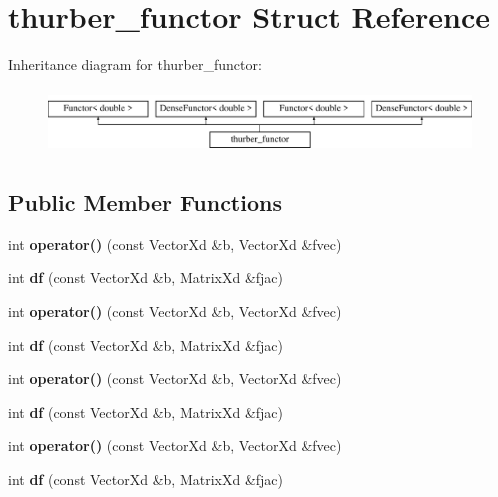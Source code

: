\hypertarget{structthurber__functor}{}\section{thurber\+\_\+functor Struct Reference}
\label{structthurber__functor}
Inheritance diagram for thurber\+\_\+functor\+:\begin{figure}[H]
\begin{center}
\leavevmode
\includegraphics[height=1.728395cm]{structthurber__functor}
\end{center}
\end{figure}
\subsection*{Public Member Functions}
\begin{DoxyCompactItemize}
\item 
\mbox{\label{structthurber__functor_a24194395e6284194885dd7c3061460ae}} 
int {\bfseries operator()} (const Vector\+Xd \&b, Vector\+Xd \&fvec)
\item 
\mbox{\label{structthurber__functor_a42949c20925f9f4cc26febd17126a385}} 
int {\bfseries df} (const Vector\+Xd \&b, Matrix\+Xd \&fjac)
\item 
\mbox{\label{structthurber__functor_a24194395e6284194885dd7c3061460ae}} 
int {\bfseries operator()} (const Vector\+Xd \&b, Vector\+Xd \&fvec)
\item 
\mbox{\label{structthurber__functor_a42949c20925f9f4cc26febd17126a385}} 
int {\bfseries df} (const Vector\+Xd \&b, Matrix\+Xd \&fjac)
\item 
\mbox{\label{structthurber__functor_a24194395e6284194885dd7c3061460ae}} 
int {\bfseries operator()} (const Vector\+Xd \&b, Vector\+Xd \&fvec)
\item 
\mbox{\label{structthurber__functor_a42949c20925f9f4cc26febd17126a385}} 
int {\bfseries df} (const Vector\+Xd \&b, Matrix\+Xd \&fjac)
\item 
\mbox{\label{structthurber__functor_a24194395e6284194885dd7c3061460ae}} 
int {\bfseries operator()} (const Vector\+Xd \&b, Vector\+Xd \&fvec)
\item 
\mbox{\label{structthurber__functor_a42949c20925f9f4cc26febd17126a385}} 
int {\bfseries df} (const Vector\+Xd \&b, Matrix\+Xd \&fjac)
\end{DoxyCompactItemize}
